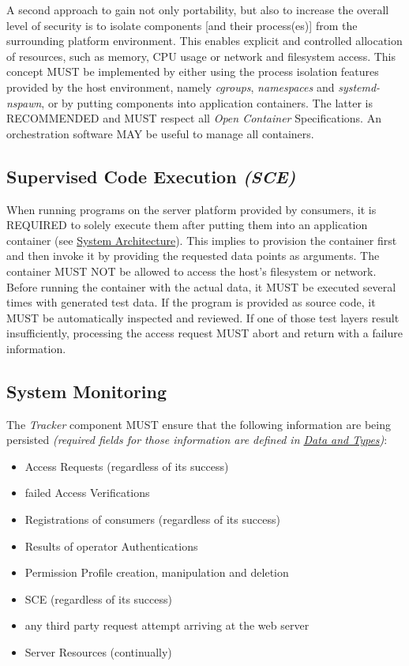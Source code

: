 \documentclass[12pt,english,a4paper,titlepage,cleardoublepage=empty,dottedtoc]{report}
\providecommand{\tightlist}{%
  \setlength{\itemsep}{0pt}\setlength{\parskip}{0pt}}
\begin{document}
A second approach to gain not only portability, but also to increase the
overall level of security is to isolate components {[}and their
process(es){]} from the surrounding platform environment. This enables
explicit and controlled allocation of resources, such as memory, CPU
usage or network and filesystem access. This concept MUST be implemented
by either using the process isolation features provided by the host
environment, namely \emph{cgroups}, \emph{namespaces} and
\emph{systemd-nspawn}, or by putting components into application
containers. The latter is RECOMMENDED and MUST respect all \emph{Open
Container} Specifications. An orchestration software MAY be useful to
manage all containers.

\subsection{\texorpdfstring{Supervised Code Execution
\emph{(SCE)}}{Supervised Code Execution (SCE)}}\label{supervised-code-execution-sce}

When running programs on the server platform provided by consumers, it
is REQUIRED to solely execute them after putting them into an
application container (see
\protect\hyperlink{system-architecture}{System Architecture}). This
implies to provision the container first and then invoke it by providing
the requested data points as arguments. The container MUST NOT be
allowed to access the host's filesystem or network. Before running the
container with the actual data, it MUST be executed several times with
generated test data. If the program is provided as source code, it MUST
be automatically inspected and reviewed. If one of those test layers
result insufficiently, processing the access request MUST abort and
return with a failure information.

\subsection{System Monitoring}\label{system-monitoring}

The \emph{Tracker} component MUST ensure that the following information
are being persisted \emph{(required fields for those information are
defined in \protect\hyperlink{data-and-types}{Data and Types})}:

\begin{itemize}
\tightlist
\item
  Access Requests (regardless of its success)
\item
  failed Access Verifications
\item
  Registrations of consumers (regardless of its success)
\item
  Results of operator Authentications
\item
  Permission Profile creation, manipulation and deletion
\item
  SCE (regardless of its success)
\item
  any third party request attempt arriving at the web server
\item
  Server Resources (continually)
\end{itemize}
\end{document}
